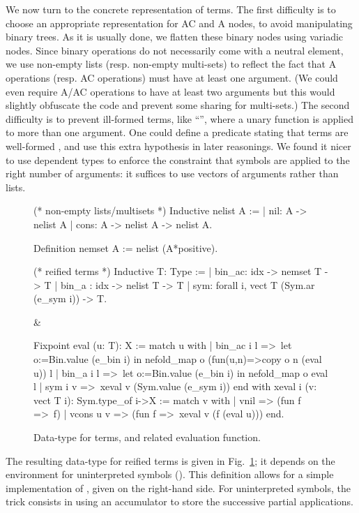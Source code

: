 \documentclass{llncs}
\begin{document}
We now turn to the concrete representation of terms.
The first difficulty is to choose an appropriate representation for AC
and A nodes, to avoid manipulating binary trees.  As it is usually
done, we flatten these binary nodes using variadic nodes. Since binary
operations do not necessarily come with a neutral element, we use
non-empty lists (resp. non-empty multi-sets) to reflect the fact that
A operations (resp. AC operations) must have at least one
argument.
(We could even require A/AC operations to have at least two
arguments but this would slightly obfuscate the code and prevent some
sharing for multi-sets.)
The second difficulty is to prevent ill-formed terms, like
\mbox{``\coqinline''}, where a unary function is applied to
more than one argument. One could define a predicate stating that
terms are well-formed \cite{contejean-04}, and use this extra
hypothesis in later reasonings. We found it nicer to use dependent
types to enforce the constraint that symbols are applied to the right
number of arguments: it suffices to use vectors of arguments rather
than lists.
\begin{figure}[t]
\begin{twolistings}
\begin{coq}
(* non-empty lists/multisets *)
Inductive nelist A := 
| nil: A -> nelist A
| cons: A -> nelist A -> nelist A.

Definition nemset A := 
  nelist (A*positive).

(* reified terms *)
Inductive T: Type := 
| bin_ac: idx -> nemset T -> T
| bin_a : idx -> nelist T -> T
| sym: forall i, vect T (Sym.ar (e_sym i))  -> T.
\end{coq}  
&
\begin{coq}
Fixpoint eval (u: T): X := 
match u with
| bin_ac i l =>~let o:=Bin.value (e_bin i) in
   nefold_map o (fun(u,n)=>copy o n (eval u)) l
| bin_a i l =>~let o:=Bin.value (e_bin i) in
   nefold_map o eval l 
| sym i v =>~xeval v (Sym.value (e_sym i))
end
with xeval i (v: vect T i): Sym.type_of i->X := 
match v with
| vnil => (fun f =>~f)
| vcons u v => (fun f =>~xeval v (f (eval u)))
end.
\end{coq}
\end{twolistings}
\caption{Data-type for terms, and related evaluation function.}
\label{fig:terms}
\end{figure}
The resulting data-type for reified terms is given in
Fig.~\ref{fig:terms}; it depends on the environment for uninterpreted
symbols (). This definition allows for a simple
implementation of , given on the right-hand side. For
uninterpreted symbols, the trick consists in using an accumulator to
store the successive partial applications.
\end{document}
